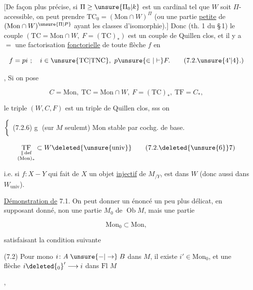 [De façon plus précise, si $\Pi\geq\unsure{\Pi_0|k}$ est un cardinal tel que $W$ soit $\Pi$-accessible, on peut prendre  $\mathrm{TC}_0=(\mathrm{Mon}\cap W)^{\Pi}$ (ou une partie \uline{petite} de $(\mathrm{Mon}\cap W)^{\unsure{\Pi|P}}$ ayant les  classes d'isomorphie).]  Donc (th. 1 du \S\,1) le couple $(\mathrm{TC}=\mathrm{Mon}\cap W,\ F=(\mathrm{TC})_*)$ est un couple de Quillen clos, et il y a $=$ une factorisation \uline{fonctorielle} de toute flèche $f$ en

\[
f=pi\ ;\quad i\in\unsure{\mathrm{TC}|\mathrm{TNC}},\ p\unsure{\in|\vdash}F.\tag*{(7.2.\unsure{4'|4}.)}
\]

, Si on pose

\[
C=\mathrm{Mon},\ \mathrm{TC}=\mathrm{Mon}\cap W,\ F=(\mathrm{TC})_*,\ \mathrm{TF}=C_*,\tag*{(7.2.5.)}
\]

le triple $(W,C,F)$ est un triple de Quillen clos, sss on  

$\left\{\vphantom{\dfrac{A}{A}}\right.$ (7.2.6) \textcircled{g}  (sur $M$ seulemt) $\mathrm{Mon}$ stable par cochg. de base.

\[
\underset{\substack{\Vert\,\mathrm{def}\\(\mathrm{Mon})_*}}{\mathrm{TF}}\subset W\deleted{\unsure{\mathrm{univ}}} \tag*{(7.2.\deleted{\unsure{6}}7)}
\]

i.e. si   $f\colon X\mathrel{-}Y$ qui fait de $X$ un objet \uline{injectif} de $M_{/Y}$, est dans $W$ (donc aussi dans $W_{\mathrm{univ}}$).


\uline{Démonstration de} 7.1. On peut donner un énoncé un peu plus délicat, en supposant  donné, non une partie $M_0$ de $\operatorname{Ob}M$, mais une partie

\[
\mathrm{Mon}_0\subset\mathrm{Mon},\tag*{(7.1)}
\]

satisfaisant la condition suivante

(7.2) Pour   mono $i\colon A\mathrel{\unsure{-|\to}} B$ dans $M$, il existe  $i'\in\mathrm{Mon}_0$, et une flèche $i\deleted{_0}'\longrightarrow i$ dans \uline{$\mathrm{Fl}$} $M$

\hfill,

